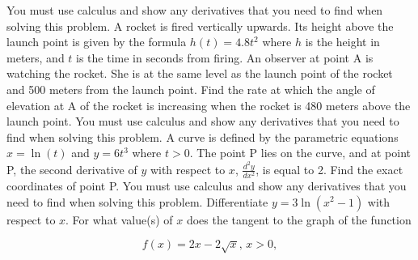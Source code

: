 \documentclass[12pt,addpoints]{exam}
\begin{document}
\begin{questions}
You must use calculus and show any derivatives that you need to find when solving this problem.
\fillwithlines{3cm}
\question[5] A rocket is fired vertically upwards. Its height above the launch point is given by the formula \( h(t) = 4.8t^2 \) where \( h \) is the height in meters, and \( t \) is the time in seconds from firing. An observer at point A is watching the rocket. She is at the same level as the launch point of the rocket and 500 meters from the launch point. Find the rate at which the angle of elevation at A of the rocket is increasing when the rocket is 480 meters above the launch point. You must use calculus and show any derivatives that you need to find when solving this problem.
\fillwithlines{3cm}
\question[5] A curve is defined by the parametric equations \( x = \ln(t) \) and \( y = 6t^3 \) where \( t > 0 \). The point P lies on the curve, and at point P, the second derivative of \( y \) with respect to \( x \), \( \frac{d^2 y}{dx^2} \), is equal to 2. Find the exact coordinates of point P. You must use calculus and show any derivatives that you need to find when solving this problem.
\fillwithlines{3cm}
\question[5] Differentiate \( y = 3\ln(x^2 - 1) \) with respect to \( x \).
\fillwithlines{3cm}
\question[5] For what value(s) of \( x \) does the tangent to the graph of the function

\[ f(x) = 2x - 2\sqrt{x}, \, x > 0, \]


\end{questions}
\end{document}
